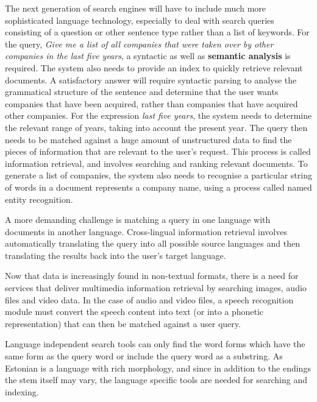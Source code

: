 \begin{multicols}{2}

The next generation of search engines will have to include much more sophisticated language technology, especially to deal with search queries consisting of a question or other sentence type rather than a list of keywords. For the query, \textit{Give me a list of all companies that were taken over by other companies in the last five years}, a syntactic as well as \textbf{semantic analysis} is required. The system also needs to provide an index to quickly retrieve relevant documents. A satisfactory answer will require syntactic parsing to analyse the grammatical structure of the sentence and determine that the user wants companies that have been acquired, rather than companies that have acquired other companies. For the expression \textit{last five years}, the system needs to determine the relevant range of years, taking into account the present year. The query then needs to be matched against a huge amount of unstructured data to find the pieces of information that are relevant to the user’s request. This process is called information retrieval, and involves searching and ranking relevant documents. To generate a list of companies, the system also needs to recognise a particular string of words in a document represents a company name, using a process called named entity recognition.

A more demanding challenge is matching a query in one language with documents in another language. Cross-lingual information retrieval involves automatically translating the query into all possible source languages and then translating the results back into the user's target language.

Now that data is increasingly found in non-textual formats, there is a need for services that deliver multimedia information retrieval by searching images, audio files and video data. In the case of audio and video files, a speech recognition module must convert the speech content into text (or into a phonetic representation) that can then be matched against a user query.

Language independent search tools can only find the word forms which have the same form as the query word or include the query word as a substring.  As Estonian is a language with rich morphology, and since in addition to the endings the stem itself may vary, the language specific tools are needed for searching and indexing.


\end{multicols}

